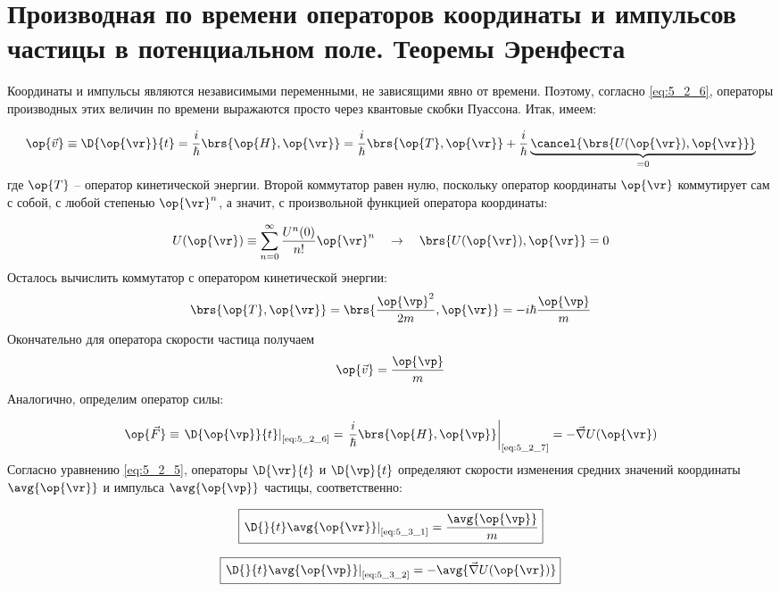 \section{Производная по времени операторов координаты и импульсов частицы в потенциальном поле. Теоремы Эренфеста}

Координаты и импульсы являются независимыми переменными, не зависящими явно от времени. Поэтому, согласно \eqref{eq:5_2_6}, операторы производных этих величин по времени выражаются просто через квантовые скобки Пуассона. Итак, имеем:

$$
  \op{\vec{v}} \equiv \D{\op{\vr}}{t} = \frac{i}{\hbar} \brs{\op{H}, \op{\vr}} =
    \frac{i}{\hbar} \brs{\op{T}, \op{\vr}} + \frac{i}{\hbar} \underbrace{
      \cancel{\brs{U(\op{\vr}), \op{\vr}}}
    }_{= 0}
$$%
%
где $\op{T}$ -- оператор кинетической энергии. Второй коммутатор равен нулю, поскольку оператор координаты $\op{\vr}$ коммутирует сам с собой, с любой степенью $\op{\vr}^n$, а значит, с произвольной функцией оператора координаты:

$$
U(\op{\vr}) \equiv \sum_{n=0}^{\infty} \frac{U^{n}(0)}{n!}\op{\vr}^n ~~~ \to ~~~ \brs{U(\op{\vr}), \op{\vr}} = 0
$$%
%
Осталось вычислить коммутатор с оператором кинетической энергии:
$$
  \brs{\op{T}, \op{\vr}} = \brs{\frac{\op{\vp}^2}{2m}, \op{\vr}} =
  -i \hbar \frac{\op{\vp}}{m}
$$%
%
Окончательно для оператора скорости частица получаем
\begin{equation}
\label{eq:5_3_1}
  \op{\vec{v}} = \frac{\op{\vp}}{m}
\end{equation}%
%
Аналогично, определим оператор силы:

\begin{equation}
\label{eq:5_3_2}
  \op{\vec{F}} \equiv \left. \D{\op{\vp}}{t} \right|_{
    \text{\eqref{eq:5_2_6}}
  } = \left. \frac{i}{\hbar} \brs{\op{H}, \op{\vp}} \right|_{
    \text{\eqref{eq:5_2_7}}
  } = - \vec{\nabla} U(\op{\vr})
\end{equation}%
%
Согласно уравнению \eqref{eq:5_2_5}, операторы $\D{\vr}{t}$ и $\D{\vp}{t}$ определяют скорости изменения средних значений координаты $\avg{\op{\vr}}$ и импульса $\avg{\op{\vp}}$ частицы, соответственно:

\begin{equation}
\label{eq:5_3_3}
\boxed {
	\left. \D{}{t}\avg{\op{\vr}} \right|_{\text{\eqref{eq:5_3_1}}} = \frac{\avg{\op{\vp}}}{m}
}
\end{equation}

\begin{equation}
\label{eq:5_3_4}
\boxed {
	\left. \D{}{t}\avg{\op{\vp}} \right|_{\text{\eqref{eq:5_3_2}}} = - \avg{\vec{\nabla} U(\op{\vr})}
}
\end{equation}

